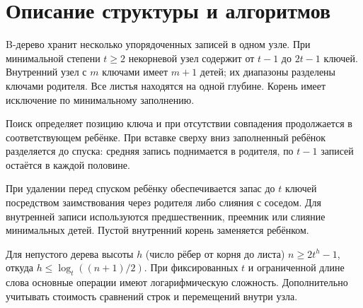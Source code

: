 \section{Описание структуры и алгоритмов}
B-дерево хранит несколько упорядоченных записей в одном узле.
При минимальной степени $t\ge2$ некорневой узел содержит от $t-1$ до $2t-1$
ключей. Внутренний узел с $m$ ключами имеет $m+1$ детей; их диапазоны разделены
ключами родителя. Все листья находятся на одной глубине.
Корень имеет исключение по минимальному заполнению.

Поиск определяет позицию ключа и при отсутствии совпадения продолжается
в соответствующем ребёнке. При вставке сверху вниз заполненный ребёнок
разделяется до спуска: средняя запись поднимается в родителя, по $t-1$
записей остаётся в каждой половине.

При удалении перед спуском ребёнку обеспечивается запас до $t$ ключей
посредством заимствования через родителя либо слияния с соседом.
Для внутренней записи используются предшественник, преемник или слияние
минимальных детей. Пустой внутренний корень заменяется ребёнком.

Для непустого дерева высоты $h$ (число рёбер от корня до листа)
$n\ge2t^h-1$, откуда $h\le\log_t((n+1)/2)$.
При фиксированных $t$ и ограниченной длине слова основные операции
имеют логарифмическую сложность. Дополнительно учитывать стоимость
сравнений строк и перемещений внутри узла.
